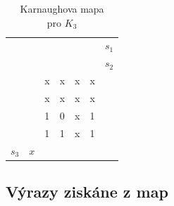 \begin{table}[!htb]
 \centering
        \caption{Karnaughova mapa\\ pro $K_3$}
    \begin{tabular}{lllllll}
      			       &       					 &       				 & \colorbox{yellow}{} &	\colorbox{yellow}{}&         &$s_1$ \\
    		 	       &        					&\colorbox{red}{}        & \colorbox{red}{}    & 				      &         &$s_2$     \\
    		 	       &        					& x    				 & x    				   & x     				& x       &  \\
              	       & \colorbox{black}{}       & x     				 & x    				   & x   		  			& x       &  \\
\colorbox{blue}{}& \colorbox{black}{}       & 1    				 & 0     				   & x     				& 1       &  \\
\colorbox{blue}{}&       					 & 1   				 & 1				  	   & x    					& 1       &  \\
    	  $ s_3$ 	& $x$  					&     				 &       				   &       				  	 &          &  \\
    \end{tabular}%
\end{table}%
	
	
\subsection{Výrazy ziskáne z map}
	
	
 